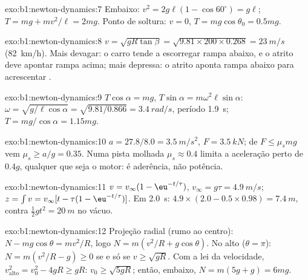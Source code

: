 \begin{solution}{exo:b1:newton-dynamics:7}
Embaixo: $v^2 = 2g\ell(1 - \cos 60^\circ) = g\ell$; $T = mg + mv^2/\ell =
2mg$. Ponto de soltura: $v = 0$, $T = mg\cos\theta_0 = 0.5mg$.
\end{solution}

\begin{solution}{exo:b1:newton-dynamics:8}
$v = \sqrt{gR\tan\beta} = \sqrt{9.81 \times 200 \times 0.268} = \qty{23}{m/s}$
(\qty{82}{km/h}). Mais devagar: o carro tende a escorregar rampa abaixo, e o atrito
deve apontar rampa acima; mais depressa: o atrito aponta rampa abaixo para acrescentar
.
\end{solution}

\begin{solution}{exo:b1:newton-dynamics:9}
$T\cos\alpha = mg$, $T\sin\alpha = m\omega^2\ell\sin\alpha$: $\omega =
\sqrt{g/\ell\cos\alpha} = \sqrt{9.81/0.866} = \qty{3.4}{rad/s}$, período
\qty{1.9}{s}; $T = mg/\cos\alpha = 1.15mg$.
\end{solution}

\begin{solution}{exo:b1:newton-dynamics:10}
$a = 27.8/8.0 = \qty{3.5}{m/s^2}$, $F = \qty{3.5}{kN}$; de $F \leq \mu_smg$
vem $\mu_s \geq a/g = 0.35$. Numa pista molhada $\mu_s \approx 0.4$ limita a
aceleração perto de $0.4g$, qualquer que seja o motor: é aderência, não potência.
\end{solution}

\begin{solution}{exo:b1:newton-dynamics:11}
$v = v_\infty(1 - \eu^{-t/\tau})$, $v_\infty = g\tau = \qty{4.9}{m/s}$;
$z = \int v = v_\infty[t - \tau(1 - \eu^{-t/\tau})]$. Em \qty{2.0}{s}:
$4.9 \times (2.0 - 0.5 \times 0.98) = \qty{7.4}{m}$, contra $\tfrac12 gt^2
= \qty{20}{m}$ no vácuo.
\end{solution}

\begin{solution}{exo:b1:newton-dynamics:12}
Projeção radial (rumo ao centro): $N - mg\cos\theta = mv^2/R$, logo
$N = m(v^2/R + g\cos\theta)$. No alto ($\theta = \pi$): $N = m(v^2/R - g)
\geq 0$ se e só se $v \geq \sqrt{gR}$. Com a lei da velocidade, $v_{\text{alto}}^2 =
v_0^2 - 4gR \geq gR$: $v_0 \geq \sqrt{5gR}$; então, embaixo, $N =
m(5g + g) = 6mg$.
\end{solution}

